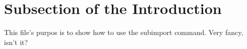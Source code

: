 \section{Subsection of the Introduction}

This file's purpos is to show how to use the subimport command. Very
fancy, isn't it?

